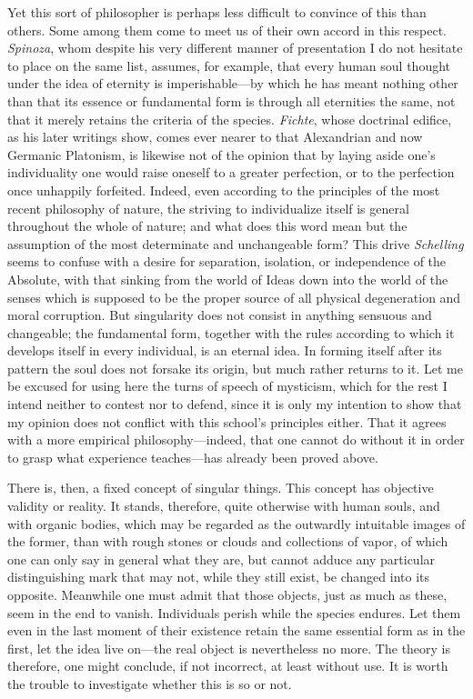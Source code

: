 \documentclass[12pt,a4paper]{article}
\begin{document}
Yet this sort of philosopher is perhaps less difficult to convince of this than
others. Some among them come to meet us of their own accord in this respect.
\emph{Spinoza}, whom despite his very different manner of presentation I do not
hesitate to place on the same list, assumes, for example, that every human soul
thought under the idea of eternity is imperishable---by which he has meant
nothing other than that its essence or fundamental form is through all eternities
the same, not that it merely retains the criteria of the species. \emph{Fichte},
whose doctrinal edifice, as his later writings show, comes ever nearer to that
Alexandrian and now Germanic Platonism, is likewise not of the opinion that by
laying aside one's individuality one would raise oneself to a greater perfection,
or to the perfection once unhappily forfeited. Indeed, even according to the
principles of the most recent philosophy of nature, the striving to individualize
itself is general throughout the whole of nature; and what does this word mean
but the assumption of the most determinate and unchangeable form? This drive
\emph{Schelling} seems to confuse with a desire for separation, isolation, or
independence of the Absolute, with that sinking from the world of Ideas down into
the world of the senses which is supposed to be the proper source of all physical
degeneration and moral corruption. But singularity does not consist in anything
sensuous and changeable; the fundamental form, together with the rules according
to which it develops itself in every individual, is an eternal idea. In forming
itself after its pattern the soul does not forsake its origin, but much rather
returns to it. Let me be excused for using here the turns of speech of mysticism,
which for the rest I intend neither to contest nor to defend, since it is only my
intention to show that my opinion does not conflict with this school's principles
either. That it agrees with a more empirical philosophy---indeed, that one cannot
do without it in order to grasp what experience teaches---has already been proved
above.

There is, then, a fixed concept of singular things. This concept has objective
validity or reality. It stands, therefore, quite otherwise with human souls, and
with organic bodies, which may be regarded as the outwardly intuitable images of
the former, than with rough stones or clouds and collections of vapor, of which
one can only say in general what they are, but cannot adduce any particular
distinguishing mark that may not, while they still exist, be changed into its
opposite. Meanwhile one must admit that those objects, just as much as these,
seem in the end to vanish. Individuals perish while the species endures. Let them
even in the last moment of their existence retain the same essential form as in
the first, let the idea live on---the real object is nevertheless no more. The
theory is therefore, one might conclude, if not incorrect, at least without use.
It is worth the trouble to investigate whether this is so or not.
\end{document}
